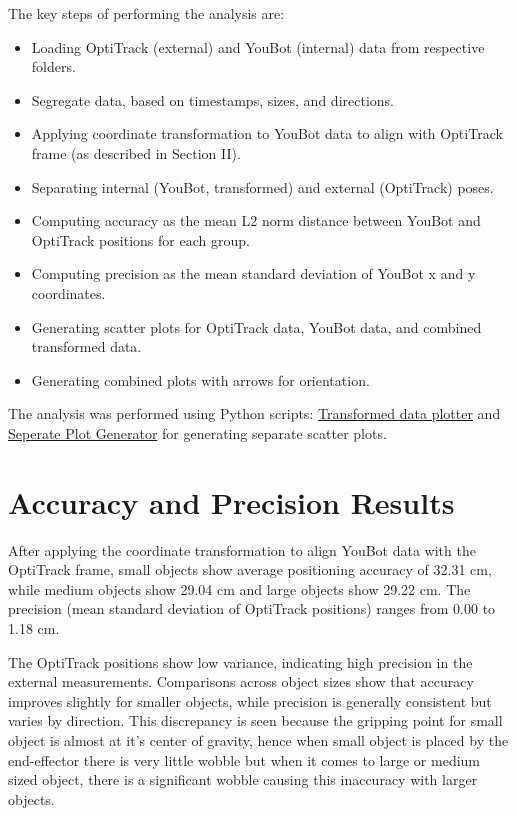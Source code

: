 The key steps of performing the analysis are:

\begin{itemize}
    \item Loading OptiTrack (external) and YouBot (internal) data from respective folders.
    \item Segregate data, based on timestamps, sizes, and directions.
    \item Applying coordinate transformation to YouBot data to align with OptiTrack frame (as described in Section II).
    \item Separating internal (YouBot, transformed) and external (OptiTrack) poses.
    \item Computing accuracy as the mean L2 norm distance between YouBot and OptiTrack positions for each group.
    \item Computing precision as the mean standard deviation of YouBot x and y coordinates.
    \item Generating scatter plots for OptiTrack data, YouBot data, and combined transformed data.
    \item Generating combined plots with arrows for orientation.
\end{itemize}
The analysis was performed using Python scripts: \href{https://github.com/Nikhil-URG/KUKA-Youbot-RobotArm_Manipulation/blob/Exp6_results/transformed_data_plotter.py}{Transformed data plotter} and \href{https://github.com/Nikhil-URG/KUKA-Youbot-RobotArm_Manipulation/blob/Exp6_results/separate_plots_generator.py}{Seperate Plot Generator} for generating separate scatter plots. 

\section{Accuracy and Precision Results}

After applying the coordinate transformation to align YouBot data with the OptiTrack frame, small objects show average positioning accuracy of 32.31 cm, while medium objects show 29.04 cm and large objects show 29.22 cm. The precision (mean standard deviation of OptiTrack positions) ranges from 0.00 to 1.18 cm.

The OptiTrack positions show low variance, indicating high precision in the external measurements. Comparisons across object sizes show that accuracy improves slightly for smaller objects, while precision is generally consistent but varies by direction. This discrepancy is seen because the gripping point for small object is almost at it's center of gravity, hence when small object is placed by the end-effector there is very little wobble but when it comes to large or medium sized object, there is a significant wobble causing this inaccuracy with larger objects.

